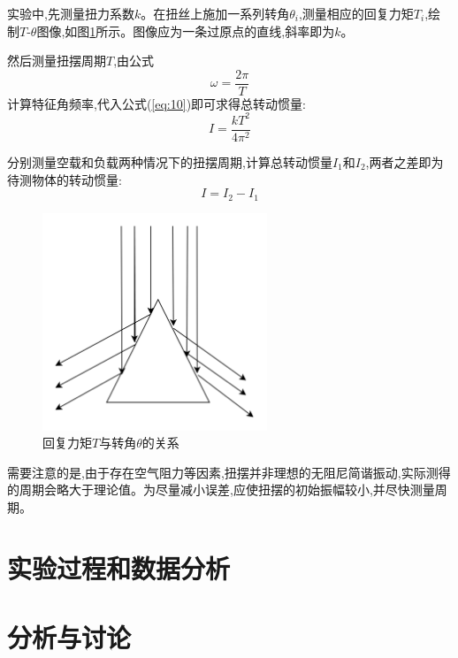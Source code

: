 \documentclass[UTF8]{ctexart}
\begin{document}
    实验中,先测量扭力系数$k$。在扭丝上施加一系列转角$\theta_i$,测量相应的回复力矩$T_i$,绘制$T$-$\theta$图像,如图\ref{fig:4}所示。图像应为一条过原点的直线,斜率即为$k$。
    
    然后测量扭摆周期$T$,由公式
    \begin{equation}
    \omega=\frac{2\pi}{T} \label{eq:11}
    \end{equation}
    计算特征角频率,代入公式(\ref{eq:10})即可求得总转动惯量:
    \begin{equation}
    I=\frac{kT^2}{4\pi^2} \label{eq:12}
    \end{equation}
    
    分别测量空载和负载两种情况下的扭摆周期,计算总转动惯量$I_1$和$I_2$,两者之差即为待测物体的转动惯量:
    \begin{equation}
    I=I_2-I_1 \label{eq:13}
    \end{equation}
    
    \begin{figure}[htbp]
    \centering
    \includegraphics[width=0.6\textwidth]{T-theta.png}
    \caption{回复力矩$T$与转角$\theta$的关系} \label{fig:4}
    \end{figure}
    
    需要注意的是,由于存在空气阻力等因素,扭摆并非理想的无阻尼简谐振动,实际测得的周期会略大于理论值。为尽量减小误差,应使扭摆的初始振幅较小,并尽快测量周期。


\section{实验过程和数据分析}

\section{分析与讨论}
\end{document}

